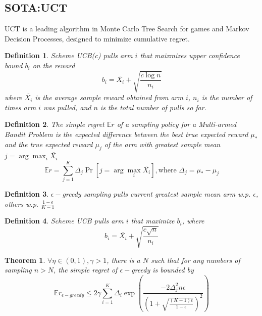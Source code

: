 \documentclass[11pt]{article}
\theoremstyle{definitionstyle}
\newtheorem{defn}{Definition}
\newtheorem{thm}{Theorem}
\newenvironment{framedminipage}
    {\begin{framed}\begin{minipage}{0.9\textwidth}}
    {\end{minipage}\end{framed}}
\begin{document}
\subsection{SOTA:UCT}
UCT is a leading algorithm in Monte Carlo Tree Search for games and Markov Decision Processes, designed to minimize cumulative regret.\\
\begin{framedminipage}
\begin{defn}
Scheme UCB(c) pulls arm $i$ that maixmizes upper confidence bound $b_i$ on the reward
\[
    b_i=\overline{X_i}+\sqrt{\frac{c\log n}{n_i}}
\]
where \( \overline{X_i} \) is the average sample reward obtained from arm \( i \), \( n_i \) is the number of times arm \( i \) was pulled, and \( n \) is the total number of pulls so far.
\end{defn}
\begin{defn}
The simple regret $\mathbb{E}r$ of a sampling policy for a Multi-armed Bandit Problem is the expected difference between the best true expected reward $\mu_*$ and the true expected reward $\mu_j$ of the arm with greatest sample mean $j=\arg\max_i\overline{X_i}$
\[
    \mathbb{E}r=\sum_{j=1}^K\Delta_j\Pr[j=\arg\max_i\overline{X_i}],\text{where }\Delta_j=\mu_*-\mu_j
\]
\end{defn}
\begin{defn}
$\epsilon-$greedy sampling pulls current greatest sample mean arm w.p. $\epsilon$, others w.p. $\frac{1-\epsilon}{K-1}$
\end{defn}
\begin{defn}
Scheme UCB pulls arm $i$ that maximize $b_i$, where 
\[
    b_i=\overline{X_i}+\sqrt{\frac{c\sqrt{n}}{n_i}}
\]
\end{defn}
\end{framedminipage}
\begin{framedminipage}
\begin{thm}
$\forall\eta\in(0,1),\gamma>1$, there is a $N$ such that for any numbers of sampling $n>N$, the simple regret of $\epsilon-$greedy is bounded by
\[
    \mathbb{E}r_{\epsilon-greedy}\le2\gamma\sum_{i=1}^K\Delta_i\exp\left(\frac{-2\Delta_j^2n\epsilon}{\left(1+\sqrt{\frac{(K-1)\epsilon}{1-\epsilon}}\right)^2}\right)
\]
\end{thm}
\end{framedminipage}
\end{document}
